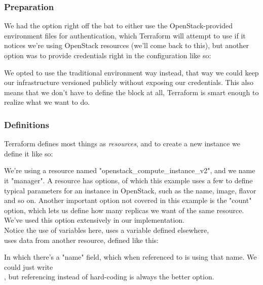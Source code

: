             \subsubsection{Preparation}
                We had the option right off the bat to either use the OpenStack-provided environment files for authentication, which Terraform will attempt to use if it notices we're using OpenStack resources (we'll come back to this), but another option was to provide credentials right in the configuration like so:
            
            
                We opted to use the traditional environment way instead, that way we could keep our infrastructure versioned publicly without exposing our credentials. This also means that we don't have to define the  block at all, Terraform is smart enough to realize what we want to do.

            \subsubsection{Definitions}
                Terraform defines most things as \textit{resources}, and to create a new instance we define it like so:
            
            
                We're using a resource named "openstack\_compute\_instance\_v2", and we name it "manager". A resource has options, of which this example uses a few to define typical parameters for an instance in OpenStack, such as the name, image, flavor and so on. Another important option not covered in this example is the "count" option, which lets us define how many replicas we want of the same resource. We've used this option extensively in our implementation.\\
            
                Notice the use of variables here,  uses a variable defined elsewhere, \\
                 uses data from another resource, defined like this:
            
                
                In which there's a "name" field, which when referenced to is using that name. We could just write\\
                , but referencing instead of hard-coding is always the better option.\\
                
